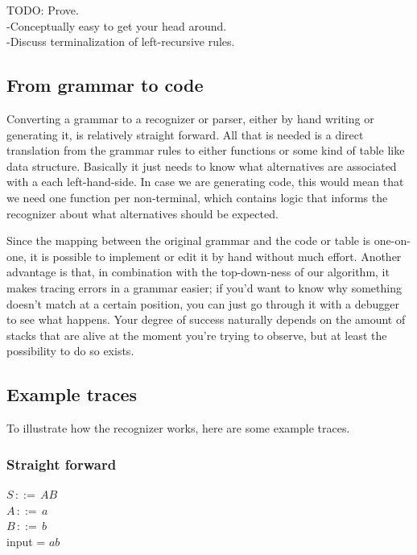 \documentclass[a4paper,10pt]{article}
\begin{document}
TODO: Prove.\\
-Conceptually easy to get your head around.\\
-Discuss terminalization of left-recursive rules.

\subsection{From grammar to code}

Converting a grammar to a recognizer or parser, either by hand writing or generating it, is relatively straight forward. All that is needed is a direct translation from the grammar rules to either functions or some kind of table like data structure. Basically it just needs to know what alternatives are associated with a each left-hand-side. In case we are generating code, this would mean that we need one function per non-terminal, which contains logic that informs the recognizer about what alternatives should be expected.

Since the mapping between the original grammar and the code or table is one-on-one, it is possible to implement or edit it by hand without much effort. Another advantage is that, in combination with the top-down-ness of our algorithm, it makes tracing errors in a grammar easier; if you'd want to know why something doesn't match at a certain position, you can just go through it with a debugger to see what happens. Your degree of success naturally depends on the amount of stacks that are alive at the moment you're trying to observe, but at least the possibility to do so exists.

\subsection{Example traces}

To illustrate how the recognizer works, here are some example traces.

\subsubsection{Straight forward}
$S\,::=\,AB$\\
$A\,::=\,a$\\
$B\,::=\,b$\\
input = $ab$
\end{document}
